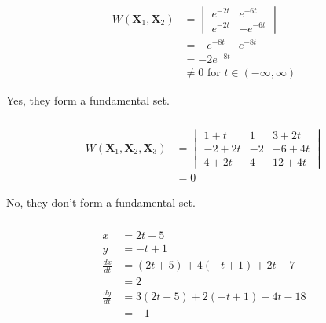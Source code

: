 \documentclass{article}
\begin{document}
\setcounter{subsubsection}{16}
\subsubsection{}

\begin{align*}
  W(\mathbf{X}_1, \mathbf{X}_2) & = \begin{vmatrix}
                                      e^{-2 t} & e^{-6 t}  \\
                                      e^{-2 t} & -e^{-6 t}
                                    \end{vmatrix}                     \\
                                & = -e^{-8 t} - e^{-8 t}                     \\
                                & = -2 e^{-8 t}                              \\
                                & \ne 0 \text{ for } t \in (-\infty, \infty)
\end{align*}

Yes, they form a fundamental set.

\setcounter{subsubsection}{18}
\subsubsection{}

\begin{align*}
  W(\mathbf{X}_1, \mathbf{X}_2, \mathbf{X}_3) & = \begin{vmatrix}
                                                    1 + t    & 1  & 3 + 2 t  \\
                                                    -2 + 2 t & -2 & -6 + 4 t \\
                                                    4 + 2 t  & 4  & 12 + 4 t
                                                  \end{vmatrix} \\
                                              & = 0
\end{align*}

No, they don't form a fundamental set.

\setcounter{subsubsection}{20}
\subsubsection{}

\begin{align*}
  x               & = 2 t + 5                             \\
  y               & = -t + 1                              \\
  \frac{d x}{d t} & = (2 t + 5) + 4 (-t + 1) + 2 t - 7    \\
                  & = 2                                   \\
  \frac{d y}{d t} & = 3 (2 t + 5) + 2 (-t + 1) - 4 t - 18 \\
                  & = -1
\end{align*}
\end{document}

